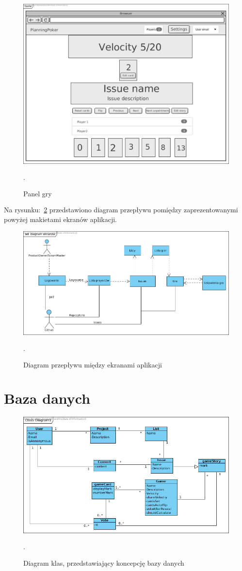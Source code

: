\begin{figure}[H]
	\centering\includegraphics[width=.7\textwidth]{img/GameScreen}
	\caption{Panel gry}.\label{rys:GameScreen}
\end{figure}

Na rysunku:~\ref{rys:ScreensDiagram} przedstawiono diagram przepływu pomiędzy
zaprezentowanymi powyżej makietami ekranów aplikacji.

\begin{figure}[H]
	\centering\includegraphics[width=\textwidth]{img/ScreensDiagram}
	\caption{Diagram przepływu między ekranami aplikacji}.\label{rys:ScreensDiagram}
\end{figure}

\section{Baza danych}

\begin{figure}[H]
	\centering\includegraphics[width=\textwidth]{img/ClassDiagram}
	\caption{Diagram klas, przedstawiający koncepcję bazy danych}.\label{rys:ClassDiagram}
\end{figure}

